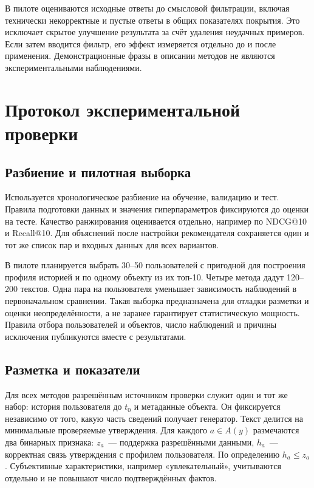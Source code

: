 \documentclass{misisarticle}
\begin{document}
В пилоте оцениваются исходные ответы до смысловой фильтрации, включая технически некорректные и пустые ответы в общих показателях покрытия. Это исключает скрытое улучшение результата за счёт удаления неудачных примеров. Если затем вводится фильтр, его эффект измеряется отдельно до и после применения. Демонстрационные фразы в описании методов не являются экспериментальными наблюдениями.

\section{Протокол экспериментальной проверки}

\subsection{Разбиение и пилотная выборка}

Используется хронологическое разбиение на обучение, валидацию и тест. Правила подготовки данных и значения гиперпараметров фиксируются до оценки на тесте. Качество ранжирования оценивается отдельно, например по NDCG@10 и Recall@10. Для объяснений после настройки рекомендателя сохраняется один и тот же список пар и входных данных для всех вариантов.

В пилоте планируется выбрать 30--50 пользователей с пригодной для построения профиля историей и по одному объекту из их топ-10. Четыре метода дадут 120--200 текстов. Одна пара на пользователя уменьшает зависимость наблюдений в первоначальном сравнении. Такая выборка предназначена для отладки разметки и оценки неопределённости, а не заранее гарантирует статистическую мощность. Правила отбора пользователей и объектов, число наблюдений и причины исключения публикуются вместе с результатами.

\subsection{Разметка и показатели}

Для всех методов разрешённым источником проверки служит один и тот же набор: история пользователя до $t_0$ и метаданные объекта. Он фиксируется независимо от того, какую часть сведений получает генератор. Текст делится на минимальные проверяемые утверждения. Для каждого $a\in A(y)$ размечаются два бинарных признака: $z_a$~--- поддержка разрешёнными данными, $h_a$~--- корректная связь утверждения с профилем пользователя. По определению $h_a\leq z_a$. Субъективные характеристики, например «увлекательный», учитываются отдельно и не повышают число подтверждённых фактов.
\end{document}
